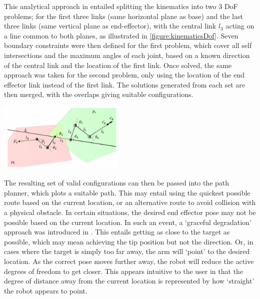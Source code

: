 \documentclass[11pt]{article}
\begin{document}
This analytical approach in \cite{GreggSmithKinematics} entailed splitting the kinematics into two 3 DoF problems; for the first three links (same horizontal plane as base) and the last three links (same vertical plane as end-effector), with the central link \(l_3\) acting on a line common to both planes, as illustrated in \ref{figure:kinematicsDof}. Seven boundary constraints were then defined for the first problem, which cover all self intersections and the maximum angles of each joint, based on a known direction of the central link and the location of the first link. Once solved, the same approach was taken for the second problem, only using the location of the end effector link instead of the first link. The solutions generated from each set are then merged, with the overlaps giving suitable configurations. 

\begin{center}
\includegraphics[width=0.45\textwidth]{kinematicsDof.png}
\label{figure:kinematicsDof}
\end{center}

The resulting set of valid configurations can then be passed into the path planner, which plots a suitable path. This may entail using the quickest possible route based on the current location, or an alternative route to avoid collision with a physical obstacle. In certain situations, the desired end effector pose may not be possible based on the current location. In such an event, a `graceful degradation' approach was introduced in \cite{GreggSmithKinematics}. This entails getting as close to the target as possible, which may mean achieving the tip position but not the direction. Or, in cases where the target is simply too far away, the arm will `point' to the desired location. As the correct pose moves further away, the robot will reduce the active degrees of freedom to get closer. This appears intuitive to the user in that the degree of distance away from the current location is represented by how `straight' the robot appears to point.
\end{document}
